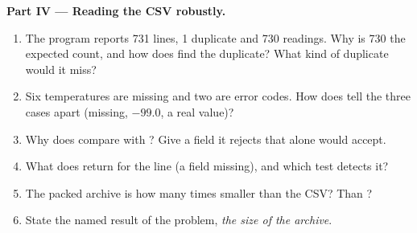 \begin{problem}
\medskip\noindent\textbf{Part IV --- Reading the CSV robustly.}
\begin{enumerate}[resume]
\item The program reports 731 lines, 1 duplicate and 730 readings. Why is 730 the expected count, and how does
 find the duplicate? What kind of duplicate would it miss?
\item Six temperatures are missing and two are error codes. How does  tell the three cases apart
(missing, $-99.0$, a real value)?
\item Why does  compare  with ? Give a field it rejects that 
alone would accept.
\item What does  return for the line  (a field missing), and
which test detects it?
\item The packed archive is how many times smaller than the CSV? Than ?
\item State the named result of the problem, \emph{the size of the archive}.
\end{enumerate}
\end{problem}
